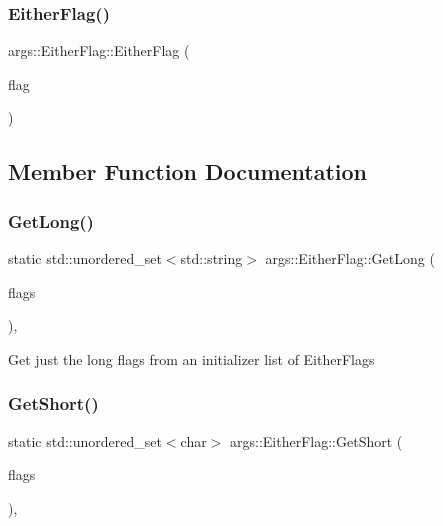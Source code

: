 \subsubsection{\texorpdfstring{Either\+Flag()}{EitherFlag()}\hspace{0.1cm}{\footnotesize\ttfamily [3/3]}}
{\footnotesize\ttfamily args\+::\+Either\+Flag\+::\+Either\+Flag (\begin{DoxyParamCaption}\item[{const char}]{flag }\end{DoxyParamCaption})\hspace{0.3cm}{\ttfamily [inline]}}



\subsection{Member Function Documentation}
\mbox{\label{structargs_1_1_either_flag_adfbd76246674351b77adadb99c1f961e}} 
\subsubsection{\texorpdfstring{Get\+Long()}{GetLong()}}
{\footnotesize\ttfamily static std\+::unordered\+\_\+set$<$std\+::string$>$ args\+::\+Either\+Flag\+::\+Get\+Long (\begin{DoxyParamCaption}\item[{std\+::initializer\+\_\+list$<$ \hyperlink{structargs_1_1_either_flag}{Either\+Flag} $>$}]{flags }\end{DoxyParamCaption})\hspace{0.3cm}{\ttfamily [inline]}, {\ttfamily [static]}}

Get just the long flags from an initializer list of Either\+Flags \mbox{\label{structargs_1_1_either_flag_ae08b6f663ad7f00b441443a2376411e9}} 
\subsubsection{\texorpdfstring{Get\+Short()}{GetShort()}}
{\footnotesize\ttfamily static std\+::unordered\+\_\+set$<$char$>$ args\+::\+Either\+Flag\+::\+Get\+Short (\begin{DoxyParamCaption}\item[{std\+::initializer\+\_\+list$<$ \hyperlink{structargs_1_1_either_flag}{Either\+Flag} $>$}]{flags }\end{DoxyParamCaption})\hspace{0.3cm}{\ttfamily [inline]}, {\ttfamily [static]}}

